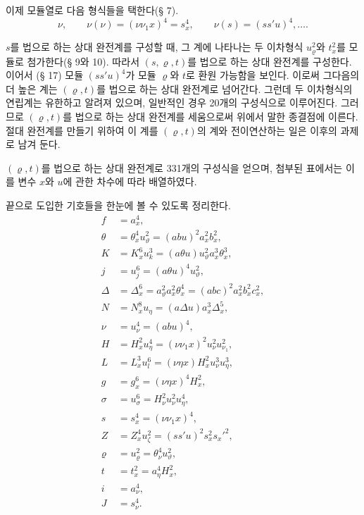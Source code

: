 이제 모듈열로 다음 형식들을 택한다(§ 7).
\[
\nu,\qquad \nu(\nu)=(\nu\nu_1x)^4=s_x^4,\qquad \nu(s)=(ss'u)^4,\ldots .
\]

$s$를 법으로 하는 상대 완전계를 구성할 때, 그 계에 나타나는 두 이차형식 $u_\varrho^2$와 $t_x^2$를 모듈로 첨가한다(§ 9와 10). 따라서 $(s,\varrho,t)$를 법으로 하는 상대 완전계를 구성한다. 이어서 (§ 17) 모듈 $(ss'u)^4$가 모듈 $\varrho$와 $t$로 환원 가능함을 보인다. 이로써 그다음의 더 높은 계는 $(\varrho,t)$를 법으로 하는 상대 완전계로 넘어간다. 그런데 두 이차형식의 연립계는 유한하고 알려져 있으며, 일반적인 경우 20개의 구성식으로 이루어진다. 그러므로 $(\varrho,t)$를 법으로 하는 상대 완전계를 세움으로써 위에서 말한 종결점에 이른다. 절대 완전계를 만들기 위하여 이 계를 $(\varrho,t)$의 계와 전이연산하는 일은 이후의 과제로 남겨 둔다.

$(\varrho,t)$를 법으로 하는 상대 완전계로 331개의 구성식을 얻으며, 첨부된 표에서는 이를 변수 $x$와 $u$에 관한 차수에 따라 배열하였다.

끝으로 도입한 기호들을 한눈에 볼 수 있도록 정리한다.
\begin{align*}
f&=a_x^4,\\
\theta&=\theta_x^4u_\vartheta^2=(abu)^2a_x^2b_x^2,\\
K&=K_x^6u_k^3=(a\theta u)u_\vartheta^2a_x^3\theta_x^3,\\
j&=u_j^6=(a\theta u)^4u_\vartheta^2,\\
\Delta&=\Delta_x^6=a_\vartheta^2a_x^2\theta_x^4=(abc)^2a_x^2b_x^2c_x^2,\\
N&=N_x^8u_\eta=(a\Delta u)a_x^3\Delta_x^5,\\
\nu&=u_\nu^4=(abu)^4,\\
H&=H_x^2u_\eta^4=(\nu\nu_1x)^2u_\nu^2u_{\nu_1}^2,\\
L&=L_x^3u_l^6=(\nu\eta x)H_x^2u_\nu^3u_\eta^3,\\
g&=g_x^6=(\nu\eta x)^4H_x^2,\\
\sigma&=u_\sigma^6=H_\nu^2u_\nu^2u_\eta^4,\\
s&=s_x^4=(\nu\nu_1x)^4,\\
Z&=Z_x^4u_\zeta^2=(ss'u)^2s_x^2s_x'^2,\\
\varrho&=u_\varrho^2=\theta_\nu^4u_\vartheta^2,\\
t&=t_x^2=a_\eta^4H_x^2,\\
i&=a_\nu^4,\\
J&=s_\nu^4.
\end{align*}

